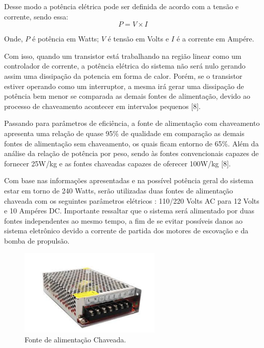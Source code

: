Desse modo a potência elétrica pode ser definida de acordo com a tensão e corrente, sendo essa:
\begin{displaymath}
  P = V \times I
\end{displaymath}

Onde, $P$ é potência em Watts; $V$ é tensão em Volts e $I$ é a corrente em Ampére.

Com isso, quando um transistor está trabalhando na região linear como um controlador de corrente, a potência elétrica do sistema não será nulo gerando assim uma dissipação da potencia em forma de calor. Porém, se o transistor estiver operando como um interruptor, a mesma irá gerar uma dissipação de potência bem menor se comparada as demais fontes de alimentação, devido ao processo de chaveamento acontecer em intervalos pequenos [8].

Passando para parâmetros de eficiência, a fonte de alimentação com chaveamento apresenta uma relação de quase 95\% de qualidade em comparação as demais fontes de alimentação sem chaveamento, os quais ficam entorno de 65\%. Além da análise da relação de potência por peso, sendo às fontes convencionais capazes de fornecer 25W/kg e as fontes chaveadas capazes de oferecer 100W/kg [8].

Com base nas informações apresentadas e na possível potência geral do sistema estar em torno de 240 Watts, serão utilizadas duas fontes de alimentação chaveada com os seguintes parâmetros elétricos : 110/220 Volts AC para 12 Volts e 10 Ampéres DC. Importante ressaltar que o sistema será alimentado por duas fontes independentes ao mesmo tempo, a fim de se evitar possíveis danos ao sistema eletrônico devido a corrente de partida dos motores de escovação e da bomba de propulsão.
\par
\begin{figure}[h]
  \centering
  \includegraphics[width=0.6\textwidth]{figures/power-supply.png}
  \caption{Fonte de alimentação Chaveada. }
  \label{fig:power-supply}
\end{figure}
\FloatBarrier
\par

